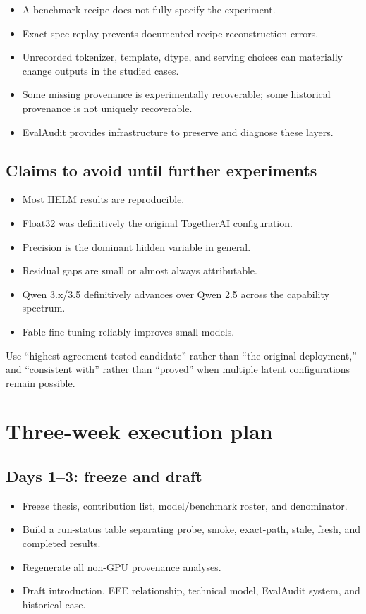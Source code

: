 \documentclass[11pt]{article}
\begin{document}
\begin{itemize}
  \item A benchmark recipe does not fully specify the experiment.
  \item Exact-spec replay prevents documented recipe-reconstruction errors.
  \item Unrecorded tokenizer, template, dtype, and serving choices can materially change outputs in the studied cases.
  \item Some missing provenance is experimentally recoverable; some historical provenance is not uniquely recoverable.
  \item EvalAudit provides infrastructure to preserve and diagnose these layers.
\end{itemize}

\subsection{Claims to avoid until further experiments}

\begin{itemize}
  \item Most HELM results are reproducible.
  \item Float32 was definitively the original TogetherAI configuration.
  \item Precision is the dominant hidden variable in general.
  \item Residual gaps are small or almost always attributable.
  \item Qwen 3.x/3.5 definitively advances over Qwen 2.5 across the capability spectrum.
  \item Fable fine-tuning reliably improves small models.
\end{itemize}

Use ``highest-agreement tested candidate'' rather than ``the original deployment,'' and ``consistent with'' rather than ``proved'' when multiple latent configurations remain possible.

\section{Three-week execution plan}

\subsection{Days 1--3: freeze and draft}

\begin{itemize}
  \item Freeze thesis, contribution list, model/benchmark roster, and denominator.
  \item Build a run-status table separating probe, smoke, exact-path, stale, fresh, and completed results.
  \item Regenerate all non-GPU provenance analyses.
  \item Draft introduction, EEE relationship, technical model, EvalAudit system, and historical case.
\end{itemize}
\end{document}
